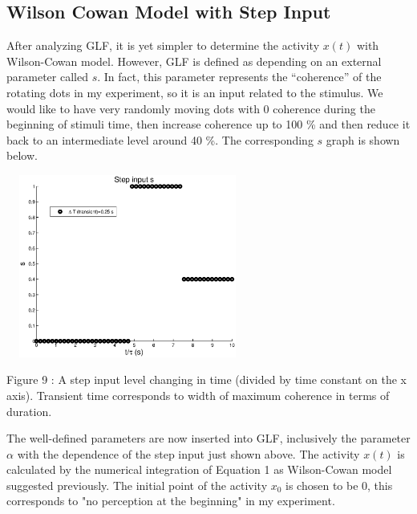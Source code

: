 \documentclass[twocolumn]{article}
\begin{document}
\subsection{Wilson Cowan Model with Step Input}
After analyzing GLF, it is yet simpler to determine the activity $x(t)$ with Wilson-Cowan model. However, GLF is defined as depending on an external parameter called $s$. In fact, this parameter represents the ``coherence'' of the rotating dots in my experiment, so it is an input related to the stimulus. We would like to have very randomly moving dots with 0 coherence during the beginning of stimuli time, then increase coherence up to 100 \% and then reduce it back to an intermediate level around 40 \%. The corresponding $s$ graph is shown below. 

 \begin{center}
\includegraphics[width=80mm,height=60mm]{step_s.eps} 
   \begin{footnotesize} Figure 9 : A step input level changing in time (divided by time constant on the x axis).  Transient time corresponds to width of maximum coherence in terms of duration. \end{footnotesize}
\end{center}

The well-defined parameters are now inserted into GLF, inclusively the parameter $\alpha$ with the dependence of the step input just shown above. The activity $x(t)$ is calculated by the numerical integration of Equation 1 as Wilson-Cowan model suggested previously. The initial point of the activity $x_0$ is chosen to be 0, this corresponds to "no perception at the beginning" in my experiment.
\end{document}
